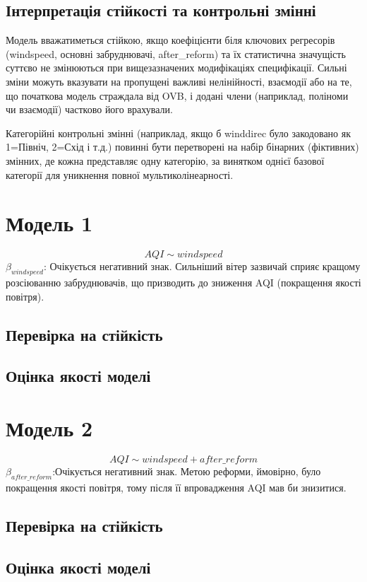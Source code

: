 \documentclass{article}
\begin{document}
\subsection{Інтерпретація стійкості та контрольні змінні}
Модель вважатиметься стійкою, якщо коефіцієнти біля ключових регресорів (windspeed, основні забруднювачі, after\_reform) та їх статистична значущість суттєво не змінюються при вищезазначених модифікаціях специфікації. Сильні зміни можуть вказувати на пропущені важливі нелінійності, взаємодії або на те, що початкова модель страждала від OVB, і додані члени (наприклад, поліноми чи взаємодії) частково його врахували.

Категорійні контрольні змінні (наприклад, якщо б winddirec було закодовано як 1=Північ, 2=Схід і т.д.) повинні бути перетворені на набір бінарних (фіктивних) змінних, де кожна представляє одну категорію, за винятком однієї базової категорії для уникнення повної мультиколінеарності.

\newpage
\section{Модель 1}
$$AQI \sim windspeed $$
   $\beta_{windspeed}$: Очікується негативний знак. 
  Сильніший вітер зазвичай сприяє кращому розсіюванню забруднювачів, 
  що призводить до зниження AQI (покращення якості повітря).
\subsection{Перевірка на стійкість}
\subsection{Оцінка якості моделі}

\newpage
\section{Модель 2}
$$AQI \sim windspeed + after\_reform $$
   $\beta_{after\_reform}$:Очікується негативний знак. 
   Метою реформи, ймовірно, було покращення якості повітря,
   тому після її впровадження AQI мав би знизитися.
\subsection{Перевірка на стійкість}
\subsection{Оцінка якості моделі}
\end{document}
